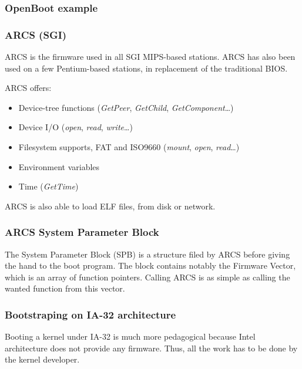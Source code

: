 
\begin{frame}
  \frametitle{OpenBoot example}

  \begin{center}
  \end{center}

\end{frame}

%
%

\begin{frame}
  \frametitle{ARCS (SGI)}

  ARCS is the firmware used in all SGI MIPS-based stations. ARCS has
  also been used on a few Pentium-based stations, in replacement of
  the traditional BIOS.

  \-

  ARCS offers:

  \begin{itemize}
  \item
    Device-tree functions (\emph{GetPeer}, \emph{GetChild},
    \emph{GetComponent}\ldots)
  \item
    Device I/O (\emph{open}, \emph{read}, \emph{write}\ldots)
  \item
    Filesystem supports, FAT and ISO9660 (\emph{mount}, \emph{open},
    \emph{read}\ldots)
  \item
    Environment variables
  \item
    Time (\emph{GetTime})
  \end{itemize}

  \-

  ARCS is also able to load ELF files, from disk or network.

\end{frame}


\begin{frame}
  \frametitle{ARCS System Parameter Block}

  The System Parameter Block (SPB) is a structure filed by ARCS before
  giving the hand to the boot program. The block contains notably the
  Firmware Vector, which is an array of function pointers. Calling
  ARCS is as simple as calling the wanted function from this vector.

\end{frame}


\begin{frame}
  \frametitle{Bootstraping on IA-32 architecture}

  Booting a kernel under IA-32 is much more pedagogical because Intel architecture does not provide any firmware. Thus, all the work has to be done by the kernel developer.

\end{frame}

